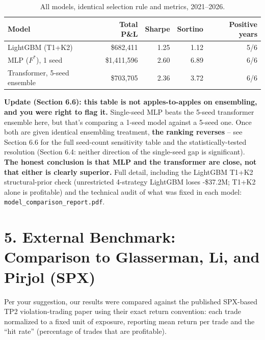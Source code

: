 \documentclass[11pt]{article}
\begin{document}
\begin{table}[H]
\centering
\small
\begin{tabular}{lrrrr}
\toprule
Model & Total P\&L & Sharpe & Sortino & Positive years \\
\midrule
LightGBM (T1+K2) & \$682,411 & 1.25 & 1.12 & 5/6 \\
MLP ($F^*$), 1 seed & \$1,411,596 & 2.60 & 6.89 & 6/6 \\
Transformer, 5-seed ensemble & \$703,705 & 2.36 & 3.72 & 6/6 \\
\bottomrule
\end{tabular}
\caption{All models, identical selection rule and metrics, 2021--2026.}
\end{table}
\textbf{Update (Section 6.6): this table is not apples-to-apples on ensembling, and you were right to flag
it.} Single-seed MLP beats the 5-seed transformer ensemble here, but that's comparing a 1-seed model
against a 5-seed one. Once both are given identical ensembling treatment, \textbf{the ranking reverses} --
see Section 6.6 for the full seed-count sensitivity table and the statistically-tested resolution (Section
6.4: neither direction of the single-seed gap is significant). \textbf{The honest conclusion is that MLP
and the transformer are close, not that either is clearly superior.} Full detail, including the LightGBM
T1+K2 structural-prior check (unrestricted 4-strategy LightGBM loses -\$37.2M; T1+K2 alone is profitable)
and the technical audit of what was fixed in each model: \texttt{model\_comparison\_report.pdf}.

\section*{5. External Benchmark: Comparison to Glasserman, Li, and Pirjol (SPX)}
Per your suggestion, our results were compared against the published SPX-based TP2 violation-trading paper
using their exact return convention: each trade normalized to a fixed unit of exposure, reporting mean
return per trade and the ``hit rate'' (percentage of trades that are profitable).
\end{document}
